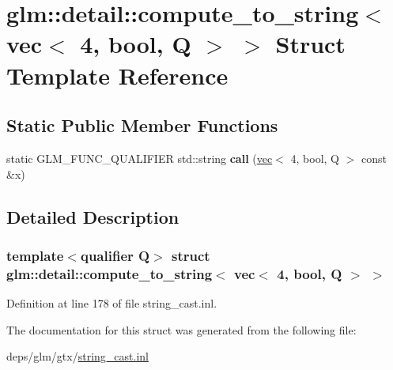 \hypertarget{structglm_1_1detail_1_1compute__to__string_3_01vec_3_014_00_01bool_00_01Q_01_4_01_4}{}\section{glm\+:\+:detail\+:\+:compute\+\_\+to\+\_\+string$<$ vec$<$ 4, bool, Q $>$ $>$ Struct Template Reference}
\label{structglm_1_1detail_1_1compute__to__string_3_01vec_3_014_00_01bool_00_01Q_01_4_01_4}
\subsection*{Static Public Member Functions}
\begin{DoxyCompactItemize}
\item 
\mbox{\label{structglm_1_1detail_1_1compute__to__string_3_01vec_3_014_00_01bool_00_01Q_01_4_01_4_acc9ef66b31a0aaa989ee98614e340e27}} 
static G\+L\+M\+\_\+\+F\+U\+N\+C\+\_\+\+Q\+U\+A\+L\+I\+F\+I\+ER std\+::string {\bfseries call} (\hyperlink{structglm_1_1vec}{vec}$<$ 4, bool, Q $>$ const \&x)
\end{DoxyCompactItemize}


\subsection{Detailed Description}
\subsubsection*{template$<$qualifier Q$>$\newline
struct glm\+::detail\+::compute\+\_\+to\+\_\+string$<$ vec$<$ 4, bool, Q $>$ $>$}



Definition at line 178 of file string\+\_\+cast.\+inl.



The documentation for this struct was generated from the following file\+:\begin{DoxyCompactItemize}
\item 
deps/glm/gtx/\hyperlink{string__cast_8inl}{string\+\_\+cast.\+inl}\end{DoxyCompactItemize}
